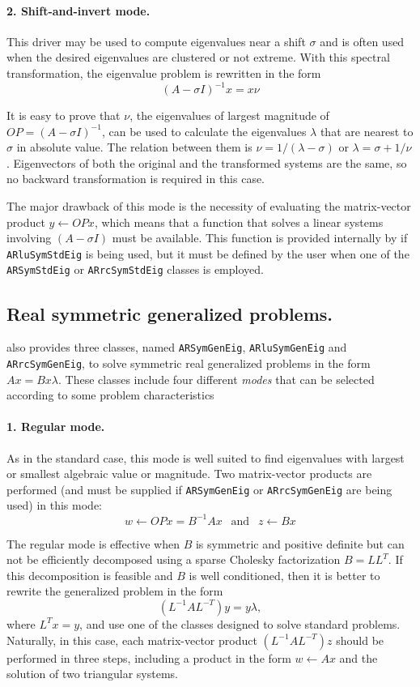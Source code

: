 \paragraph{2. Shift-and-invert mode.}
This driver may be used to compute eigenvalues near a shift $\sigma$ and is often used when the desired eigenvalues are clustered or not extreme. With this spectral transformation, the eigenvalue problem is rewritten in the form
\[(A-\sigma I)^{-1} x=x\nu\]

It is easy to prove that $\nu$, the eigenvalues of largest magnitude of $OP=(A-\sigma I)^{-1}$, can be used to calculate the eigenvalues $\lambda$ that are nearest to $\sigma$ in absolute value. The relation between them is $\nu = 1 / (\lambda - \sigma )$ or $\lambda =\sigma + 1/\nu $. Eigenvectors of both the original and the transformed systems are the same, so no backward transformation is required in this case.

The major drawback of this mode is the necessity of evaluating the matrix-vector product $y \leftarrow OPx$, which means that a function that solves a linear systems involving $(A-\sigma I)$ must be available. This function is provided internally by \ARPP{} if \texttt{ARluSymStdEig} is being used, but it must be defined by the user when one of the \texttt{ARSymStdEig} or \texttt{ARrcSymStdEig} classes is employed.

\subsection{Real symmetric generalized problems.}
\ARPP{} also provides three classes, named \texttt{ARSymGenEig}, \texttt{ARluSymGenEig} and \texttt{ARrcSymGenEig}, to solve symmetric real generalized problems in the form $Ax=Bx\lambda$. These classes include four different \textit{modes} that can be selected according to some problem characteristics 

\paragraph{1. Regular mode.}
As in the standard case, this mode is well suited to find eigenvalues with largest or smallest algebraic value or magnitude. Two matrix-vector products are performed (and must be supplied if \texttt{ARSymGenEig} or \texttt{ARrcSymGenEig} are being used) in this mode:
\[w \leftarrow OPx=B^{-1} Ax \ \ \text{ and } \ \ z \leftarrow Bx\]

The regular mode is effective when $B$ is symmetric and positive definite but can not be efficiently decomposed using a sparse Cholesky factorization $B=LL^{T}$. If this decomposition is feasible and $B$ is well conditioned, then it is better to rewrite the generalized problem in the form
\[(L^{-1} AL^{-T} )y=y\lambda,\]
where $L^{T}x=y$, and use one of the classes designed to solve standard problems. Naturally, in this case, each matrix-vector product $(L^{-1} AL^{-T})z$ should be performed in three steps, including a product in the form $w \leftarrow Ax$ and the solution of two triangular systems.

